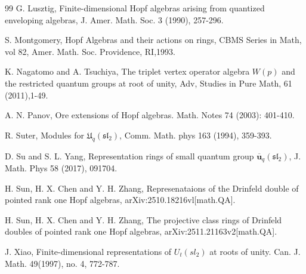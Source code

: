 \documentclass[10pt,oneside]{amsart}
\theoremstyle{definition}
\begin{document}
\begin{thebibliography}{99}
G. Lusztig, Finite-dimensional Hopf algebras arising from quantized enveloping algebras,
J. Amer. Math. Soc. 3 (1990), 257-296.

 S. Montgomery, Hopf Algebras and their actions on rings, CBMS Series in Math, vol 82, Amer. Math. Soc. Providence, RI,1993.

K. Nagatomo and A. Tsuchiya, The triplet vertex operator algebra $W(p)$ and the restricted quantum groups at root of unity, Adv, Studies in Pure Math, 61 (2011),1-49.


 A. N. Panov, Ore extensions of Hopf algebras. Math. Notes 74 (2003): 401-410.


R. Suter, Modules for $\mathfrak{U}_q(\mathfrak{sl_2})$, Comm. Math. phys 163 (1994), 359-393.

D. Su and S. L. Yang, Representation rings of small quantum group $\mathbf{\overline{u}}_q(\mathfrak{sl_2})$, J. Math. Phys 58 (2017), 091704.

H. Sun, H. X. Chen and Y. H. Zhang, Represenataions of the Drinfeld double of pointed rank one Hopf algebras, arXiv:2510.18216vl[math.QA].

H. Sun, H. X. Chen and Y. H. Zhang, The projective class rings of  Drinfeld doubles of pointed rank one Hopf algebras, arXiv:2511.21163v2[math.QA].

J. Xiao, Finite-dimensional representations of $U_t(sl_2)$ at roots of unity. Can. J. Math. 49(1997), no. 4, 772-787.

\end{thebibliography}
\end{document}
